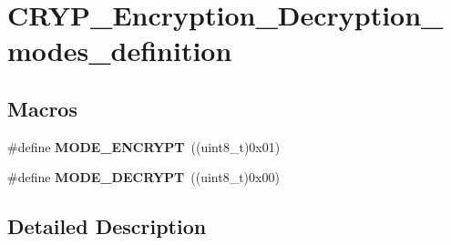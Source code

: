 \hypertarget{group___c_r_y_p___encryption___decryption__modes__definition}{\section{C\-R\-Y\-P\-\_\-\-Encryption\-\_\-\-Decryption\-\_\-modes\-\_\-definition}
\label{group___c_r_y_p___encryption___decryption__modes__definition}
}
\subsection*{Macros}
\begin{DoxyCompactItemize}
\item 
\hypertarget{group___c_r_y_p___encryption___decryption__modes__definition_ga34ad77e4aded75365ecfe2be34077891}{\#define {\bfseries M\-O\-D\-E\-\_\-\-E\-N\-C\-R\-Y\-P\-T}~((uint8\-\_\-t)0x01)}\label{group___c_r_y_p___encryption___decryption__modes__definition_ga34ad77e4aded75365ecfe2be34077891}

\item 
\hypertarget{group___c_r_y_p___encryption___decryption__modes__definition_gad455c2c9a98406dfbde2635483da69a6}{\#define {\bfseries M\-O\-D\-E\-\_\-\-D\-E\-C\-R\-Y\-P\-T}~((uint8\-\_\-t)0x00)}\label{group___c_r_y_p___encryption___decryption__modes__definition_gad455c2c9a98406dfbde2635483da69a6}

\end{DoxyCompactItemize}


\subsection{Detailed Description}
